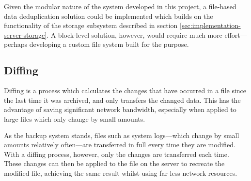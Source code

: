 Given the modular nature of the system developed in this project, a file-based
data deduplication solution could be implemented which builds on the
functionality of the storage subsystem described in section
\ref{sec:implementation-server-storage}. A block-level solution, however, would
require much more effort---perhaps developing a custom file system built for
the purpose.

\subsection{Diffing}

Diffing is a process which calculates the changes that have occurred in a file
since the last time it was archived, and only transfers the changed data. This
has the advantage of saving significant network bandwidth, especially when
applied to large files which only change by small amounts.

As the backup system stands, files such as system logs---which change by small
amounts relatively often---are transferred in full every time they are
modified. With a diffing process, however, only the changes are transferred
each time. These changes can then be applied to the file on the server to
recreate the modified file, achieving the same result whilst using far less
network resources.
